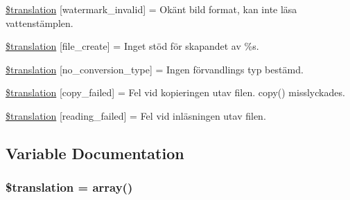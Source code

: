 \begin{DoxyCompactItemize}
\item 
\hyperlink{class_8upload_8sv___s_e_8php_ac336e7a5701e47ba4a05e9e498a3cc44}{\$translation} \mbox{[}\textquotesingle{}watermark\+\_\+invalid\textquotesingle{}\mbox{]} = \textquotesingle{}Okänt bild format, kan inte läsa vattenstämplen.\textquotesingle{}
\item 
\hyperlink{class_8upload_8sv___s_e_8php_a1ecb4673e4fb69e06b3f20b65cecf30a}{\$translation} \mbox{[}\textquotesingle{}file\+\_\+create\textquotesingle{}\mbox{]} = \textquotesingle{}Inget stöd för skapandet av \%s.\textquotesingle{}
\item 
\hyperlink{class_8upload_8sv___s_e_8php_a4712d7ec28e9a7f17eb3338af2358363}{\$translation} \mbox{[}\textquotesingle{}no\+\_\+conversion\+\_\+type\textquotesingle{}\mbox{]} = \textquotesingle{}Ingen förvandlings typ bestämd.\textquotesingle{}
\item 
\hyperlink{class_8upload_8sv___s_e_8php_a783c9358bcf54a054545b50098bc679b}{\$translation} \mbox{[}\textquotesingle{}copy\+\_\+failed\textquotesingle{}\mbox{]} = \textquotesingle{}Fel vid kopieringen utav filen. copy() misslyckades.\textquotesingle{}
\item 
\hyperlink{class_8upload_8sv___s_e_8php_a01bea14c9fd5f353f62db44beabfcd42}{\$translation} \mbox{[}\textquotesingle{}reading\+\_\+failed\textquotesingle{}\mbox{]} = \textquotesingle{}Fel vid inläsningen utav filen.\textquotesingle{}
\end{DoxyCompactItemize}


\subsection{Variable Documentation}
\hypertarget{class_8upload_8sv___s_e_8php_a1f198d410fecc3871ebdd468d343a5e3}{}
\subsubsection[{\$translation}]{\setlength{\rightskip}{0pt plus 5cm}\$translation = array()}\label{class_8upload_8sv___s_e_8php_a1f198d410fecc3871ebdd468d343a5e3}
\hypertarget{class_8upload_8sv___s_e_8php_ac7498e49b9771b04698029aa61c70821}{}
